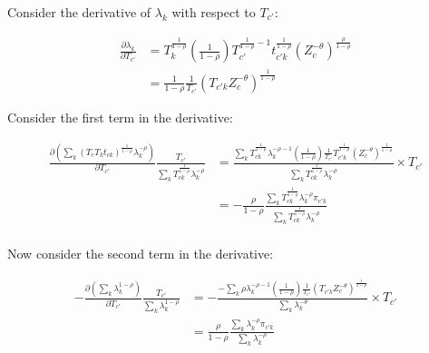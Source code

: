\documentclass[10pt]{article}
\begin{document}
Consider the derivative of $\lambda_k$ with respect to $T_{c'}$:

\begin{align*}
    \frac{\partial \lambda_k}{\partial T_{c'}} & = T_k^{\frac{1}{1 - \rho}} \left( \frac{1}{1 - \rho} \right) T_{c'}^{\frac{1}{1 - \rho} - 1} t_{c'k}^{\frac{1}{1 - \rho}} (Z_c^{- \theta})^{\frac{\rho}{1 - \rho}} \\
                                               & = \frac{1}{1 - \rho} \frac{1}{T_{c'}} (T_{c'k} Z_c^{- \theta})^{\frac{1}{1 - \rho}}
\end{align*}

Consider the first term in the derivative:

\begin{align*}
    \frac{\partial \left( \sum_{k}^{} (T_c T_k t_{ck})^{\frac{1}{1 - \rho}} \lambda_k^{- \rho} \right)}{\partial T_{c'}} \frac{T_{c'}}{\sum_{k}^{} T_{ck}^{\frac{1}{1 - \rho}} \lambda_k^{- \rho}} & = \frac{\sum_{k}^{} T_{ck}^{\frac{1}{1 - \rho}} \lambda_k^{-\rho - 1} \left( \frac{1}{1 - \rho} \right) \frac{1}{T_{c'}} T_{c'k}^{\frac{1}{1 - \rho}} (Z_c^{- \theta})^{\frac{1}{1 - \rho}}}{\sum_{k}^{} T_{ck}^{\frac{1}{1 - \rho}} \lambda_k^{- \rho}} \times T_{c'} \\
                                                                                                                                                                                                   & = - \frac{\rho}{1 - \rho} \frac{\sum_{k}^{}T_{ck}^{\frac{1}{1 - \rho}} \lambda_k^{- \rho} \pi_{c'k}}{\sum_{k}^{} T_{ck}^{\frac{1}{1 - \rho}} \lambda_k^{- \rho}}                                                                                                       \\
\end{align*}

Now consider the second term in the derivative:

\begin{align*}
    - \frac{\partial \left( \sum_{k}^{} \lambda_k^{1 - \rho} \right)}{\partial T_{c'}} \frac{T_{c'}}{\sum_{k}^{} \lambda_k^{1 - \rho}} & = - \frac{- \sum_{k}^{} \rho \lambda_k^{- \rho - 1} \left( \frac{1}{1 - \rho} \right) \frac{1}{T_{c'}} (T_{c'k} Z_c^{- \theta})^{\frac{1}{1 - \rho}}}{\sum_{k}^{} \lambda_k^{- \theta}} \times T_{c'} \\
                                                                                                                                       & = \frac{\rho}{1 - \rho} \frac{\sum_{k}^{} \lambda_k^{- \rho} \pi_{c'k} }{\sum_{k}^{} \lambda_k^{- \rho}}                                                                                              \\
\end{align*}
\end{document}
